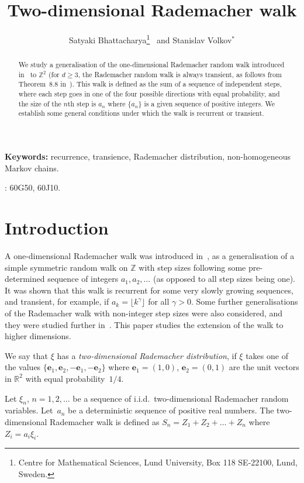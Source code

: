 \documentclass[12pt]{article}
\title{Two-dimensional Rademacher walk}
\author{Satyaki Bhattacharya\thanks{Centre for Mathematical Sciences, Lund University, Box 118 SE-22100, Lund, Sweden.} \ and Stanislav Volkov${}^*$}
\newcommand\R{\mathbb{R}}
\newcommand\Z{\mathbb{Z}}
\newcommand\be{\mathbf{e}}
\begin{document}
\maketitle
\begin{abstract}
We study a generalisation of the one-dimensional Rademacher random walk introduced in~\cite{BV} to $\Z^2$ (for $d\ge 3$, the Rademacher random walk is always transient, as follows from Theorem~8.8 in~\cite{EV}). This walk is defined as the sum of a sequence of independent steps, where each step goes in one of the four possible directions with equal probability, and the size of the $n$th step is $a_n$ where $\{a_n\}$ is a given sequence of positive integers. We establish some general conditions under which the walk is recurrent or transient.
\end{abstract}

\medskip\noindent\textbf{Keywords:}  recurrence, transience, Rademacher distribution, non-homogeneous Markov chains.

: 60G50, 60J10.  




\section{Introduction}
A one-dimensional Rademacher walk was introduced in~\cite{BV}, as a generalisation of a simple symmetric random walk on $\Z$ with step sizes following some pre-determined sequence of integers $a_1,a_2,\dots$ (as opposed to all step sizes being one). It was shown that this walk is recurrent for some very slowly growing sequences, and transient, for example, if $a_k=\lfloor k^\gamma\rfloor$ for all $\gamma>0$. Some further generalisations of the Rademacher walk with non-integer step sizes were also considered, and they were studied further in~\cite{Bristol}. This paper studies the extension of the walk to higher dimensions.

We say that $\xi$ has a {\em two-dimensional Rademacher distribution}, if $\xi$ takes one of  the values $\{\be_1,\be_2,-\be_1,-\be_2\}$ where $\be_1=(1,0)$, $\be_2=(0,1)$ are the unit vectors in $\R^2$ with equal probability~$1/4$.


Let $\xi_n$, $n=1,2,\dots$ be a sequence of i.i.d.\ two-dimensional Rademacher random variables. Let~$a_n$ be a deterministic sequence of positive real numbers. The two-dimensional Rademacher walk is defined as $S_n=Z_1+Z_2+\dots+Z_n$ where $Z_i=a_i \xi_i$.
\end{document}
